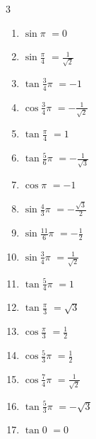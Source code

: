 \begin{multicols}{3}
\begin{enumerate}
  \item $\displaystyle \sin{\pi}$
        $\displaystyle =0$

  \item $\displaystyle \sin{\frac{\pi}{4}}$
        $\displaystyle =\frac{1}{\sqrt{2}}$

  \item $\displaystyle \tan{\frac{3}{4}\pi}$
        $\displaystyle =-1$

  \item $\displaystyle \cos{\frac{3}{4}\pi}$
        $\displaystyle =-\frac{1}{\sqrt{2}}$

  \item $\displaystyle \tan{\frac{\pi}{4}}$
        $\displaystyle =1$

  \item $\displaystyle \tan{\frac{5}{6}\pi}$
        $\displaystyle =-\frac{1}{\sqrt{3}}$

  \item $\displaystyle \cos{\pi}$
        $\displaystyle =-1$

  \item $\displaystyle \sin{\frac{4}{3}\pi}$
        $\displaystyle =-\frac{\sqrt{3}}{2}$

  \item $\displaystyle \sin{\frac{11}{6}\pi}$
        $\displaystyle =-\frac{1}{2}$

  \item $\displaystyle \sin{\frac{3}{4}\pi}$
        $\displaystyle =\frac{1}{\sqrt{2}}$

  \item $\displaystyle \tan{\frac{5}{4}\pi}$
        $\displaystyle =1$

  \item $\displaystyle \tan{\frac{\pi}{3}}$
        $\displaystyle =\sqrt{3}$

  \item $\displaystyle \cos{\frac{\pi}{3}}$
        $\displaystyle =\frac{1}{2}$

  \item $\displaystyle \cos{\frac{5}{3}\pi}$
        $\displaystyle =\frac{1}{2}$

  \item $\displaystyle \cos{\frac{7}{4}\pi}$
        $\displaystyle =\frac{1}{\sqrt{2}}$

  \item $\displaystyle \tan{\frac{5}{3}\pi}$
        $\displaystyle =-\sqrt{3}$

  \item $\displaystyle \tan{0}$
        $\displaystyle =0$


\end{enumerate}
\end{multicols}
